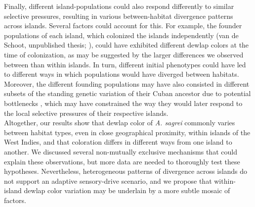 Finally, different island-populations could also respond differently to similar selective pressures, resulting in various between-habitat divergence patterns across islands. Several factors could account for this. For example, the founder populations of each island, which colonized the islands independently (van de Schoot, unpublished thesis; \citealt{Driessens2017, Reynolds2020}), could have exhibited different dewlap colors at the time of colonization, as may be suggested by the larger differences we observed between than within islands. In turn, different initial phenotypes could have led to different ways in which populations would have diverged between habitats. Moreover, the different founding populations may have also consisted in different subsets of the standing genetic variation of their Cuban ancestor due to potential bottlenecks \citep{Reynolds2020}, which may have constrained the way they would later respond to the local selective pressures of their respective islands.\\

Altogether, our results show that dewlap color of \textit{A. sagrei} commonly varies between habitat types, even in close geographical proximity, within islands of the West Indies, and that coloration differs in different ways from one island to another. We discussed several non-mutually exclusive mechanisms that could explain these observations, but more data are needed to thoroughly test these hypotheses. Nevertheless, heterogeneous patterns of divergence across islands do not support an adaptive sensory-drive scenario, and we propose that within-island dewlap color variation may be underlain by a more subtle mosaic of factors.

